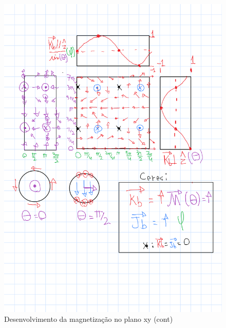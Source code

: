 \documentclass[a4paper, 12pt, twocolumn]{article}
\begin{document}
\begin{figure}
    \caption{Desenvolvimento da magnetização no plano xy (cont)}
    \label{fig:m2_cont}
    \centering
    \includegraphics[width=1\textwidth]{m2_cont.png}
\end{figure}



\end{document}
